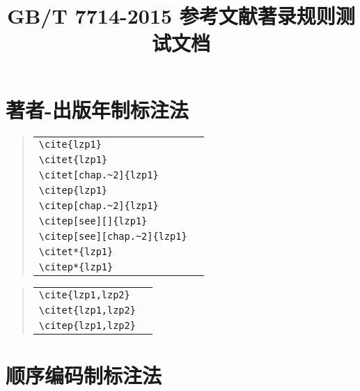 \documentclass[UTF8,a4paper,zihao=5]{ctexart}
\begin{document}
\title{GB/T 7714-2015 参考文献著录规则测试文档}
\date{}
\maketitle

\section{著者-出版年制标注法}

\begin{quote}
\begin{tabular}{l@{\quad$\Rightarrow$\quad}l}
  \verb|\cite{lzp1}| & \cite{lzp1}\\
  \verb|\citet{lzp1}| & \citet{lzp1}\\
  \verb|\citet[chap.~2]{lzp1}| & \citet[chap.~2]{lzp1}\\[0.5ex]
  \verb|\citep{lzp1}| & \citep{lzp1}\\
  \verb|\citep[chap.~2]{lzp1}| & \citep[chap.~2]{lzp1}\\
  \verb|\citep[see][]{lzp1}| & \citep[see][]{lzp1}\\
  \verb|\citep[see][chap.~2]{lzp1}| & \citep[see][chap.~2]{lzp1}\\[0.5ex]
  \verb|\citet*{lzp1}| & \citet*{lzp1}\\
  \verb|\citep*{lzp1}| & \citep*{lzp1}
\end{tabular}
\end{quote}
\begin{quote}
\begin{tabular}{l@{\quad$\Rightarrow$\quad}l}
  \verb|\cite{lzp1,lzp2}| & \cite{lzp1,lzp2}\\
  \verb|\citet{lzp1,lzp2}| & \citet{lzp1,lzp2}\\
  \verb|\citep{lzp1,lzp2}| & \citep{lzp1,lzp2}
\end{tabular}
\end{quote}

\section{顺序编码制标注法}
\end{document}
